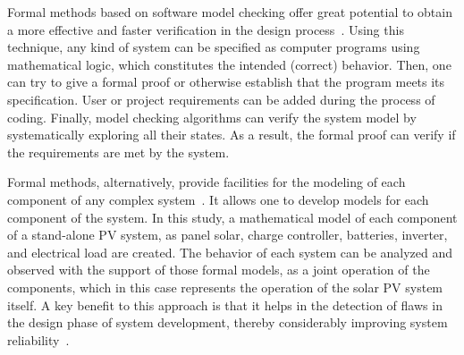 \documentclass[journal]{IEEEtran}
\begin{document}
Formal methods based on software model checking offer great potential to obtain a more effective and faster verification in the design process~\cite{ClarkeHV18}.  
 Using this technique, any kind of system can be specified as computer programs using mathematical logic, which constitutes the intended (correct) behavior. Then, one can try to give a formal proof or otherwise establish that the program meets its specification. User or project requirements can be added during the process of coding. %
%
%
Finally, model checking algorithms can verify the system model by systematically exploring all their states. As a result, the formal proof can verify if the requirements are met by the system.

Formal methods, alternatively, provide facilities for the modeling of each component of any complex system~\cite{Hall1990}. It allows one to develop models for each component of the system. In this study, a mathematical model of each component of a stand-alone PV system, as panel solar, charge controller, batteries, inverter, and electrical load are created. The behavior of each system can be analyzed and observed with the support of those formal models, as a joint operation of the components, which in this case represents the operation of the solar PV system itself. A key benefit to this approach is that it helps in the detection of flaws in the design phase of system development, thereby considerably improving system reliability~\cite{Akram2018}.
\end{document}
